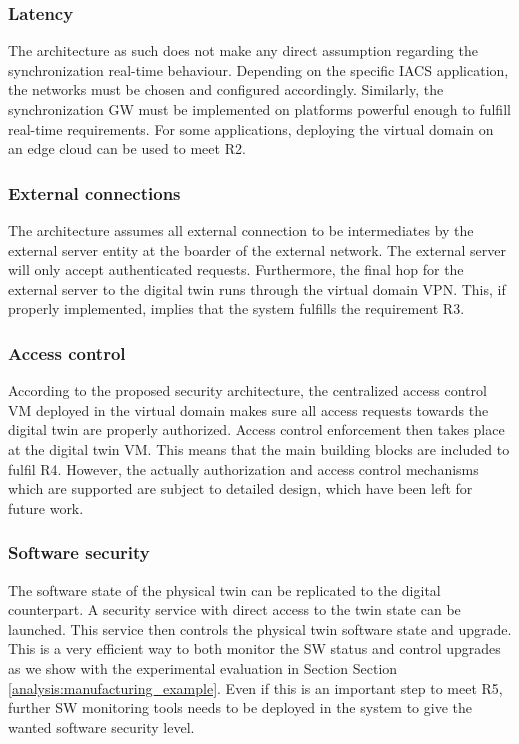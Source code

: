 \subsubsection{Latency}
The architecture as such does not make any direct assumption regarding the synchronization real-time behaviour. Depending on the specific IACS application, the networks must be chosen and configured accordingly. Similarly, the synchronization GW must be implemented on platforms powerful enough to fulfill real-time requirements. For some applications, deploying the virtual domain on an edge cloud \cite{Delsing2017} can be used to meet R2.  
\subsubsection{External connections}
The architecture assumes all external connection to be intermediates by the external server entity at the boarder of the external network. The external server will only accept authenticated requests. Furthermore, the final hop for the external server to the digital twin runs through the virtual domain VPN. This, if properly implemented, implies that the system fulfills the requirement R3. 
\subsubsection{Access control}
According to the proposed security architecture, the centralized access control VM deployed in the virtual domain makes sure all access requests towards the digital twin are properly authorized. Access control enforcement then takes place at the digital twin VM. This means that the main building blocks are included to fulfil R4. However, the actually authorization and access control mechanisms which are supported are subject to detailed design, which have been left for future work.
\subsubsection{Software security}
The software state of the physical twin can be replicated to the digital counterpart. A security service with direct access to the twin state can be launched. This service then controls the physical twin software state and upgrade. This is a very efficient way to both monitor the SW status and control upgrades as we show with the experimental evaluation in Section Section \ref{analysis:manufacturing_example}. Even if this is an important step to meet R5, further SW monitoring tools needs to be deployed in the system to give the wanted software security level.  
